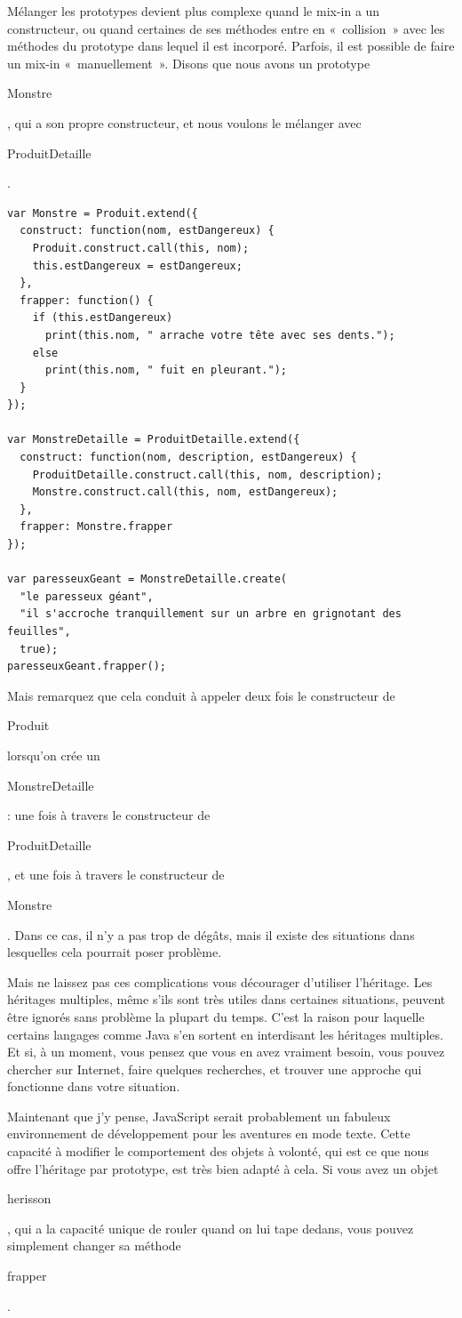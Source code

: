 \documentclass{FramateX}
\renewcommand{\texttt}[1]{\begin{sffamily}{#1}\end{sffamily}}
\begin{document}
Mélanger les prototypes devient plus complexe quand le mix-in a un
constructeur, ou quand certaines de ses méthodes entre en «~collision~»
avec les méthodes du prototype dans lequel il est incorporé. Parfois, il
est possible de faire un mix-in «~manuellement~». Disons que nous avons
un prototype \texttt{Monstre}, qui a son propre constructeur, et nous
voulons le mélanger avec \texttt{ProduitDetaille}.

\begin{lstlisting}
var Monstre = Produit.extend({
  construct: function(nom, estDangereux) {
    Produit.construct.call(this, nom);
    this.estDangereux = estDangereux;
  },
  frapper: function() {
    if (this.estDangereux)
      print(this.nom, " arrache votre tête avec ses dents.");
    else
      print(this.nom, " fuit en pleurant.");
  }
});

var MonstreDetaille = ProduitDetaille.extend({
  construct: function(nom, description, estDangereux) {
    ProduitDetaille.construct.call(this, nom, description);
    Monstre.construct.call(this, nom, estDangereux);
  },
  frapper: Monstre.frapper
});

var paresseuxGeant = MonstreDetaille.create(
  "le paresseux géant",
  "il s'accroche tranquillement sur un arbre en grignotant des feuilles",
  true);
paresseuxGeant.frapper();
\end{lstlisting}
Mais remarquez que cela conduit à appeler deux fois le constructeur de
\texttt{Produit} lorsqu'on crée un \texttt{MonstreDetaille} : une fois à
travers le constructeur de \texttt{ProduitDetaille}, et une fois à
travers le constructeur de \texttt{Monstre}. Dans ce cas, il n'y a pas
trop de dégâts, mais il existe des situations dans lesquelles cela
pourrait poser problème.

\begin{center}\end{center}

Mais ne laissez pas ces complications vous décourager d'utiliser
l'héritage. Les héritages multiples, même s'ils sont très utiles dans
certaines situations, peuvent être ignorés sans problème la plupart du
temps. C'est la raison pour laquelle certains langages comme Java s'en
sortent en interdisant les héritages multiples. Et si, à un moment, vous
pensez que vous en avez vraiment besoin, vous pouvez chercher sur
Internet, faire quelques recherches, et trouver une approche qui
fonctionne dans votre situation.

Maintenant que j'y pense, JavaScript serait probablement un fabuleux
environnement de développement pour les aventures en mode texte. Cette
capacité à modifier le comportement des objets à volonté, qui est ce que
nous offre l'héritage par prototype, est très bien adapté à cela. Si
vous avez un objet \texttt{herisson}, qui a la capacité unique de rouler
quand on lui tape dedans, vous pouvez simplement changer sa méthode
\texttt{frapper}.
\end{document}

